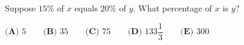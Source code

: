 Suppose $15\%$ of $x$ equals $20\%$ of $y$. What percentage of $x$ is $y$?

$\textbf{(A) }5 \qquad \textbf{(B) }35 \qquad \textbf{(C) }75 \qquad \textbf{(D) }133\dfrac13 \qquad \textbf{(E) }300$
